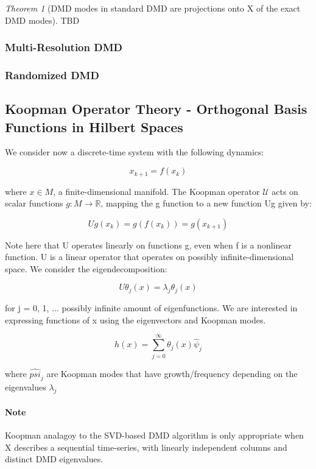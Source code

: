 \documentclass{article}
\theoremstyle{definition}
\theoremstyle{remark}
\theoremstyle{lemma}
\theoremstyle{theorem}
\newtheorem*{theorem}{Theorem}
\theoremstyle{corollary}
\theoremstyle{property}
\begin{document}
			\begin{theorem} [DMD modes in standard DMD are projections onto X of the exact DMD modes]
				TBD
			\end{theorem}



		\subsubsection{Multi-Resolution DMD}

		\subsubsection{Randomized DMD}

	\subsection{Koopman Operator Theory - Orthogonal Basis Functions in Hilbert Spaces}
		We consider now a discrete-time system with the following dynamics:

			$$x_{k+1} = f(x_k)$$

		where $x \in M$, a finite-dimensional manifold. The Koopman operator $\mathcal{U}$ acts on scalar functions $g : M \rightarrow \mathbb{R}$, mapping the g function to a new function Ug given by:

			$$Ug(x_k) = g(f(x_k)) = g(x_{k+1})$$

		Note here that U operates linearly on functions g, even when f is a nonlinear function. U is a linear operator that operates on possibly infinite-dimensional space. We consider the eigendecomposition:

			$$U \theta_j(x) = \lambda_j \theta_j(x)$$

		for j = 0, 1, ... possibly infinite amount of eigenfunctions. We are interested in expressing functions of x using the eigenvectors and Koopman modes. 

			$$h(x) = \sum_{j=0}^\infty \theta_j(x) \hat{\psi}_j$$

		where $\hat{psi}_j$ are Koopman modes that have growth/frequency depending on the eigenvalues $\lambda_j$

		\paragraph{Note}
		Koopman analagoy to the SVD-based DMD algorithm is only appropriate when X describes a sequential time-series, with linearly independent columns and distinct DMD eigenvalues.
\end{document}
